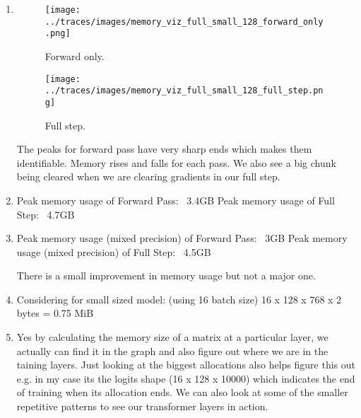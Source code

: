 \documentclass{article}
\begin{document}
\begin{enumerate}
\item
\begin{figure}[h]
    \centering
    \texttt{[image: ../traces/images/memory\_viz\_full\_small\_128\_forward\_only.png]}
    \caption{Forward only.}
\end{figure}
\begin{figure}[h]
    \centering
    \texttt{[image: ../traces/images/memory\_viz\_full\_small\_128\_full\_step.png]}
    \caption{Full step.}
\end{figure}

The peaks for forward pass have very sharp ends which makes them identifiable. Memory rises and falls for each pass. We also see a big chunk being cleared when we are clearing gradients in our full step.

\item
Peak memory usage of Forward Pass: ~3.4GB
Peak memory usage of Full Step: ~4.7GB

\item
Peak memory usage (mixed precision) of Forward Pass: ~3GB
Peak memory usage (mixed precision) of Full Step: ~4.5GB

There is a small improvement in memory usage but not a major one.

\item
Considering for small sized model: (using 16 batch size) 16 x 128 x 768 x 2 bytes = 0.75 MiB 

\item
Yes by calculating the memory size of a matrix at a particular layer, we actually can find it in the graph and also figure out where we are in the taining layers. Just looking at the biggest allocations also helps figure this out e.g. in my case its the logits shape (16 x 128 x 10000) which indicates the end of training when its allocation ends.
We can also look at some of the smaller repetitive patterns to see our transformer layers in action.
\end{enumerate}
\end{document}
